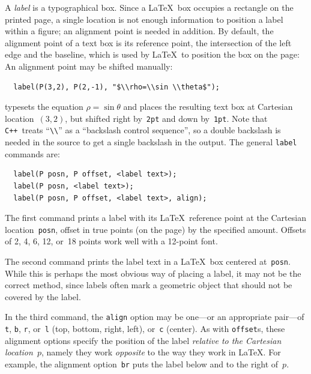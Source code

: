 \documentclass[12pt]{report}
\newcommand{\code}[1]{\texttt{#1}}
\newcommand{\CXX}{\code{C++}}
\begin{document}
A \emph{label} is a typographical box. Since a \LaTeX\ box occupies a
rectangle on the printed page, a single location is not enough
information to position a label within a figure; an alignment point is
needed in addition.  By default, the alignment point of a text box is
its reference point, the intersection of the left edge and the
baseline, which is used by \LaTeX\ to position the box on the
page:
An alignment point may be shifted manually:
\begin{verbatim}
  label(P(3,2), P(2,-1), "$\\rho=\\sin \\theta$");
\end{verbatim}
typesets the equation $\rho=\sin\theta$ and places the resulting text
box at Cartesian location~$(3,2)$, but shifted right by~\code{2pt} and
down by~\code{1pt}. Note that \CXX~treats ``\verb+\\+'' as a
``backslash control sequence'', so a double backslash is needed in the
source to get a single backslash in the output.  The general
\code{label} commands are:
\begin{verbatim}
  label(P posn, P offset, <label text>);
  label(P posn, <label text>);
  label(P posn, P offset, <label text>, align);
\end{verbatim}
The first command prints a label with its \LaTeX\ reference point at
the Cartesian location~\code{posn}, offset in true points (on the
page) by the specified amount. Offsets of 2, 4, 6, 12, or~18 points
work well with a 12-point font.

The second command prints the label text in a \LaTeX\ box centered
at~\code{posn}. While this is perhaps the most obvious way of placing
a label, it may not be the correct method, since labels often mark a
geometric object that should not be covered by the label.

In the third command, the \code{align} option may be one---or an
appropriate pair---of \code{t}, \code{b}, \code{r}, or~\code{l} (top,
bottom, right, left), or~\code{c} (center). As with \code{offset}s,
these alignment options specify the position of the label
\emph{relative to the Cartesian location}~$p$, namely they work
\emph{opposite} to the way they work in \LaTeX. For example, the
alignment option~\code{br} puts the label below and to the right
of~$p$.
\begin{center}
  \qquad
  
\end{center}
\end{document}
